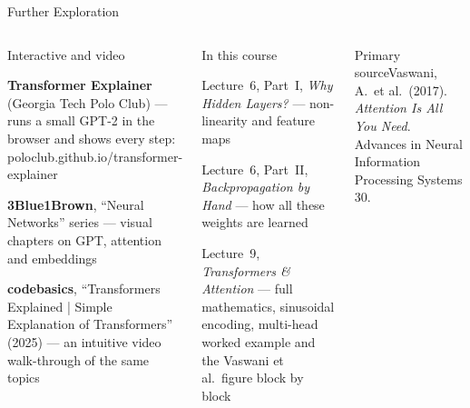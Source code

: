 \documentclass[aspectratio=169,10pt]{beamer}
\begin{document}
\begin{frame}{Further Exploration}
\begin{columns}[T]
\begin{cbox}{Interactive and video}\scriptsize
\begin{tl}
\item \textbf{Transformer Explainer} (Georgia Tech Polo Club) --- runs a small GPT-2 in the browser and shows every step: poloclub.github.io/transformer-explainer
\item \textbf{3Blue1Brown}, ``Neural Networks'' series --- visual chapters on GPT, attention and embeddings
\item \textbf{codebasics}, ``Transformers Explained | Simple Explanation of Transformers'' (2025) --- an intuitive video walk-through of the same topics
\end{tl}
\end{cbox}
\begin{cbox}[ISSAnavy]{In this course}\scriptsize
\begin{tl}
\item Lecture~6, Part~I, \emph{Why Hidden Layers?} --- non-linearity and feature maps
\item Lecture~6, Part~II, \emph{Backpropagation by Hand} --- how all these weights are learned
\item Lecture~9, \emph{Transformers \& Attention} --- full mathematics, sinusoidal encoding, multi-head worked example and the Vaswani et al.\ figure block by block
\end{tl}
\end{cbox}
\begin{cbox}{Primary source}\scriptsize Vaswani, A.\ et al.\ (2017). \emph{Attention Is All You Need}. Advances in Neural Information Processing Systems 30.\end{cbox}
\end{columns}
\end{frame}
\end{document}
